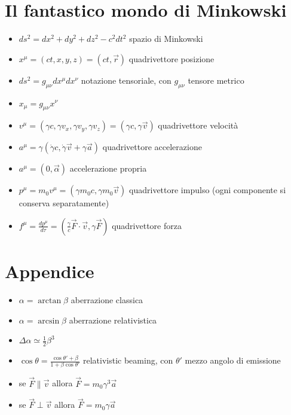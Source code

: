 \documentclass[a4paper]{article}
\begin{document}
	\section{Il fantastico mondo di Minkowski}
        \begin{itemize}
            \item $ds^2=dx^2+dy^2+dz^2-c^2dt^2$ spazio di Minkowski
            \item $x^\mu=(ct,x,y,z)=(ct,\vec{r})$ quadrivettore posizione
            \item $ds^2=g_{\mu\nu}dx^\mu d x^\nu$ notazione tensoriale, con $g_{\mu\nu}$ tensore metrico
            \item $x_\mu=g_{\mu\nu}x^\nu$
            \item $v^\mu=(\gamma c, \gamma v_x, \gamma v_y, \gamma v_z)=(\gamma c, \gamma\vec{v})$ quadrivettore velocità
            \item $a^\mu=\gamma(\dot{\gamma}c, \dot{\gamma}\vec{v}+\gamma\vec{a})$ quadrivettore accelerazione
            \item $a^\mu=(0, \vec{\alpha})$ accelerazione propria
            \item $p^\mu=m_0v^\mu=(\gamma m_0c, \gamma m_0\vec{v})$ quadrivettore impulso (ogni componente si conserva separatamente)
            \item $f^\mu=\frac{dp^\mu}{d\tau}=\left(\frac{\gamma}{c}\vec{F}\cdot\vec{v}, \gamma\vec{F}\right)$ quadrivettore forza
        \end{itemize}
    \section{Appendice}
        \begin{itemize}
            \item $\alpha=\arctan{\beta}$ aberrazione classica
            \item $\alpha=\arcsin{\beta}$ aberrazione relativistica
            \item $\Delta\alpha\simeq\frac{1}{2}\beta^3$
            \item $\cos\theta=\frac{\cos\theta'+\beta}{1+\beta\cos\theta'}$ relativistic beaming, con $\theta'$ mezzo angolo di emissione
            \item se $\vec{F}\|\vec{v}$ allora $\vec{F}=m_0\gamma^3\vec{a}$
            \item se $\vec{F}\perp\vec{v}$ allora $\vec{F}=m_0\gamma\vec{a}$
        \end{itemize}
\end{document}
